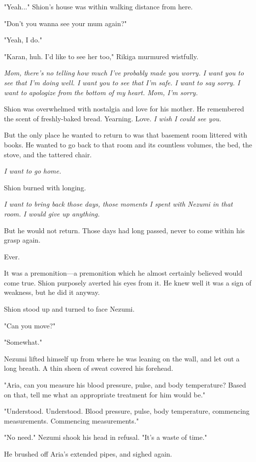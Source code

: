 "Yeah..." Shion's house was within walking distance from here.

"Don't you wanna see your mum again?"

"Yeah, I do."

"Karan, huh. I'd like to see her too," Rikiga murmured wistfully.

\emph{Mom, there's no telling how much I've probably made you worry. I want
you to see that I'm doing well. I want you to see that I'm safe. I want
to say sorry. I want to apologize from the bottom of my heart. Mom, I'm
sorry.}

Shion was overwhelmed with nostalgia and love for his mother. He
remembered the scent of freshly-baked bread. Yearning. Love. \emph{I wish I
could see you.}

But the only place he wanted to return to was that basement room
littered with books. He wanted to go back to that room and its countless
volumes, the bed, the stove, and the tattered chair.

\emph{I want to go home.}

Shion burned with longing.

\emph{I want to bring back those days, those moments I spent with Nezumi in
that room. I would give up anything.}

But he would not return. Those days had long passed, never to come
within his grasp again.

Ever.

It was a premonition---a premonition which he almost certainly believed
would come true. Shion purposely averted his eyes from it. He knew well
it was a sign of weakness, but he did it anyway.

Shion stood up and turned to face Nezumi.

"Can you move?"

"Somewhat."

Nezumi lifted himself up from where he was leaning on the wall, and let
out a long breath. A thin sheen of sweat covered his forehead.

"Aria, can you measure his blood pressure, pulse, and body temperature?
Based on that, tell me what an appropriate treatment for him would be."

{\sffamily "Understood. Understood. Blood pressure, pulse, body temperature,
commencing measurements. Commencing measurements."}

"No need." Nezumi shook his head in refusal. "It's a waste of time."

He brushed off Aria's extended pipes, and sighed again.


